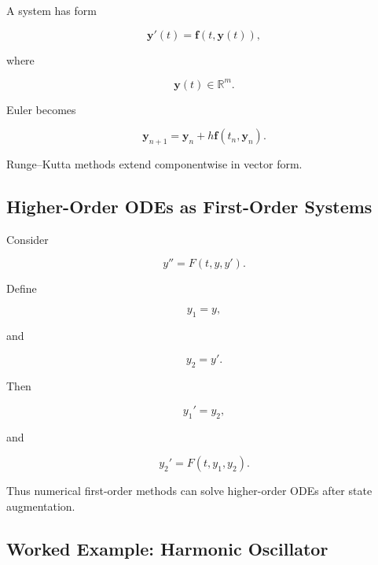 A system has form

\[
\boxed{
\mathbf{y}'(t)
=
\mathbf{f}
(
t,\mathbf{y}(t)
),
}
\]

where

\[
\mathbf{y}(t)
\in
\mathbb{R}^m.
\]

Euler becomes

\[
\boxed{
\mathbf{y}_{n+1}
=
\mathbf{y}_n
+
h
\mathbf{f}
(
t_n,\mathbf{y}_n
).
}
\]

Runge--Kutta methods extend componentwise in vector form.

\subsection{Higher-Order ODEs as First-Order Systems}
\label{subsec:higher-order-to-first-order}

Consider

\[
\boxed{
y''=F(t,y,y').
}
\]

Define

\[
\boxed{
y_1=y,
}
\]

and

\[
\boxed{
y_2=y'.
}
\]

Then

\[
\boxed{
y_1'=y_2,
}
\]

and

\[
\boxed{
y_2'
=
F(t,y_1,y_2).
}
\]

Thus numerical first-order methods can solve higher-order ODEs after state
augmentation.

\subsection{Worked Example: Harmonic Oscillator}
\label{subsec:worked-harmonic-oscillator-system}

